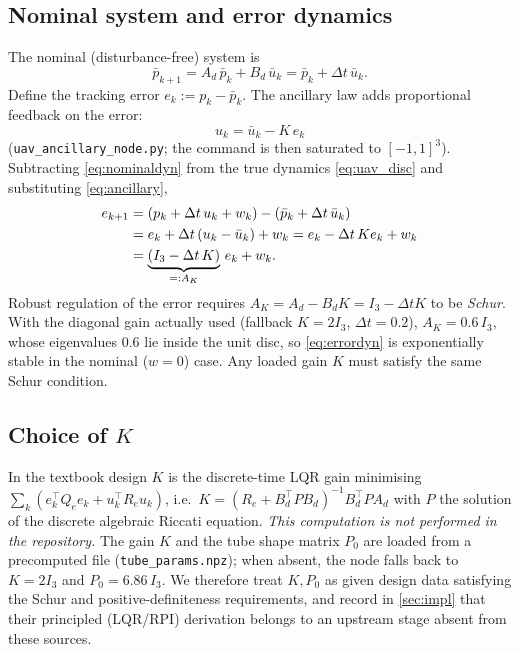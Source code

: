 \documentclass[11pt]{article}
\newcommand{\bu}{\bar{u}}
\newcommand{\bp}{\bar{p}}
\newcommand{\code}[1]{\texttt{#1}}
\begin{document}
\subsection{Nominal system and error dynamics}
The nominal (disturbance-free) system is
\begin{equation}
\bp_{k+1} = A_d\,\bp_k + B_d\,\bu_k = \bp_k + \Delta t\,\bu_k .
\label{eq:nominaldyn}
\end{equation}
Define the tracking error $e_k := p_k-\bp_k$. The ancillary law adds proportional feedback on the error:
\begin{equation}
\boxed{\,u_k = \bu_k - K\,e_k\,}
\label{eq:ancillary}
\end{equation}
(\code{uav\_ancillary\_node.py}; the command is then saturated to $[-1,1]^3$). Subtracting
\cref{eq:nominaldyn} from the true dynamics \cref{eq:uav_disc} and substituting \cref{eq:ancillary},
\begin{align}
e_{k+1}
&= (p_k+\Delta t\,u_k+w_k) - (\bp_k+\Delta t\,\bu_k) \notag\\
&= e_k + \Delta t\,(u_k-\bu_k) + w_k
 = e_k - \Delta t\,K e_k + w_k \notag\\
&= \underbrace{(I_3-\Delta t\,K)}_{=:A_K}\,e_k + w_k .
\label{eq:errordyn}
\end{align}
Robust regulation of the error requires $A_K=A_d-B_dK=I_3-\Delta t K$ to be \emph{Schur}. With the diagonal
gain actually used (fallback $K=2I_3$, $\Delta t=0.2$), $A_K=0.6\,I_3$, whose eigenvalues $0.6$ lie inside the
unit disc, so \cref{eq:errordyn} is exponentially stable in the nominal ($w=0$) case. Any loaded gain $K$
must satisfy the same Schur condition.

\subsection{Choice of $K$}
In the textbook design $K$ is the discrete-time LQR gain minimising
$\sum_k (e_k^\top Q_e e_k + u_k^\top R_e u_k)$, i.e.\ $K=(R_e+B_d^\top P B_d)^{-1}B_d^\top P A_d$ with $P$ the
solution of the discrete algebraic Riccati equation. \emph{This computation is not performed in the
repository.} The gain $K$ and the tube shape matrix $P_0$ are loaded from a precomputed file
(\code{tube\_params.npz}); when absent, the node falls back to $K=2I_3$ and $P_0=6.86\,I_3$. We therefore
treat $K,P_0$ as given design data satisfying the Schur and positive-definiteness requirements, and record in
\cref{sec:impl} that their principled (LQR/RPI) derivation belongs to an upstream stage absent from these
sources.
\end{document}
